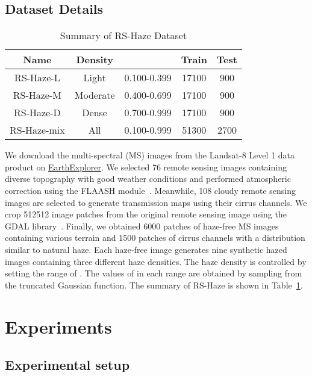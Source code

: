 \documentclass[journal]{IEEEtran}
\begin{document}
\subsection{Dataset Details}

\begin{table}[!t]
    \centering
    \renewcommand\arraystretch{1.25}
    \begin{center}
    \caption{Summary of RS-Haze Dataset}
    \label{tab:RS-Haze}
    \begin{tabular}{|ccccc|}
    \hline
    Name & Density &  & Train & Test \\
    \hline
    \hline
    RS-Haze-L & Light & 0.100-0.399 & 17100 & 900 \\
    RS-Haze-M & Moderate & 0.400-0.699 & 17100 & 900\\
    RS-Haze-D & Dense & 0.700-0.999 & 17100 & 900\\
    \hline
    RS-Haze-mix & All & 0.100-0.999 & 51300 & 2700 \\
    \hline
    \end{tabular}
    \end{center}
\end{table}

We download the multi-spectral (MS) images from the Landsat-8 Level 1 data product on \href{https://earthexplorer.usgs.gov}{EarthExplorer}.
We selected 76 remote sensing images containing diverse topography with good weather conditions and performed atmospheric correction using the FLAASH module~\cite{cooley2002flaash}.
Meanwhile, 108 cloudy remote sensing images are selected to generate transmission maps using their cirrus channels.
We crop 512512 image patches from the original remote sensing image using the GDAL library~\cite{warmerdam2008geospatial}.
Finally, we obtained 6000 patches of haze-free MS images containing various terrain and 1500 patches of cirrus channels with a distribution similar to natural haze.
Each haze-free image generates nine synthetic hazed images containing three different haze densities. 
The haze density is controlled by setting the range of . 
The values of  in each range are obtained by sampling from the truncated Gaussian function.
The summary of RS-Haze is shown in Table~\ref{tab:RS-Haze}. 
 \section{Experiments}

\subsection{Experimental setup}
\end{document}
